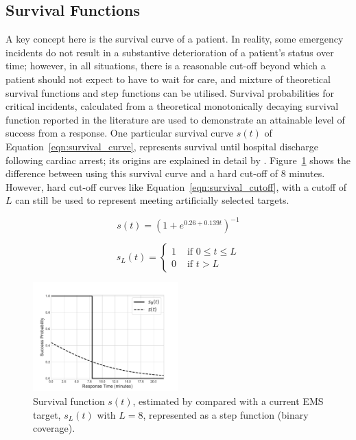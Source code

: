 \documentclass[preprint,12pt]{elsarticle}
\begin{document}
\subsection{Survival Functions}\label{sec:survival}
A key concept here is the survival curve of a patient.
In reality, some emergency incidents do not result in a substantive
deterioration of a patient’s status over time; however, in all situations,
there is a reasonable cut-off beyond which a patient should not expect to have
to wait for care, and mixture of theoretical survival functions and step
functions can be utilised.
Survival probabilities for critical incidents, calculated from a theoretical
monotonically decaying survival function reported in the literature
\cite{Valenzuela20001206} are used to demonstrate an attainable level of
success from a response. One particular survival curve $s(t)$ of
Equation~\ref{eqn:survival_curve}, represents survival until hospital
discharge following cardiac arrest; its origins are explained in detail by
\cite{Knight2012918}. Figure~\ref{fig:survivalfunction} shows the difference
between using this survival curve and a hard cut-off of 8 minutes.
However, hard cut-off curves like Equation~\ref{eqn:survival_cutoff}, with a
cutoff of $L$ can still be used to represent meeting artificially selected
targets.

\begin{equation}\label{eqn:survival_curve}
    s(t) = \left(1 + e^{0.26+0.139t}\right)^{-1}
\end{equation}

\begin{equation}\label{eqn:survival_cutoff}
    s_L(t) = \begin{cases}
    1 & \text{ if } 0\leq t \leq L \\
    0 & \text{ if } t > L 
    \end{cases}
\end{equation}

\begin{figure}[ht]
\centering
  \includegraphics[width=0.5\textwidth]{img/Survival_Function.pdf}
    \caption{Survival function $s(t)$, estimated by \cite{Valenzuela20001206}
             compared with a current EMS target, $s_L(t)$ with $L=8$,
             represented as a step function (binary coverage).}
  \label{fig:survivalfunction}
\end{figure}
\end{document}
